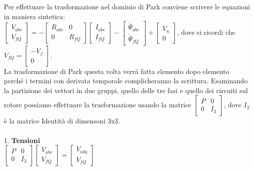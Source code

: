 \documentclass[Lau,noexaminfo]{sapthesis}
\begin{document}
	Per effettuare la trasformazione nel dominio di Park conviene scrivere le equazioni in maniera sintetica:\\
	$\begin{bmatrix}
		V_{abc}\\
		V_{fQ}
	\end{bmatrix}=-
	\begin{bmatrix}
		R_{abc} & 0\\
		0 & R_{fQ}
	\end{bmatrix}
	\begin{bmatrix}
	I_{abc}\\
	I_{fQ}
	\end{bmatrix}-
	\begin{bmatrix}
	\dot{\Psi}_{abc}\\
	\dot{\Psi}_{fQ}
	\end{bmatrix}+
	\begin{bmatrix}
	V_{n}\\
	0
	\end{bmatrix}$, dove si ricordi che\\
	$V_{fQ}=\begin{bmatrix}
	-V_{f}\\
	0
	\end{bmatrix}$.\\ La trasformazione di Park questa volta verrà fatta elemento dopo elemento perché i termini con derivata temporale complicheranno la scrittura. Esaminando la partizione dei vettori in due gruppi, quello delle tre fasi e quello dei circuiti sul rotore possiamo effettuare la trasformazione usando la matrice $\begin{bmatrix}
	P & 0\\
	0 & I_3
	\end{bmatrix}$, dove $I_3$ è la matrice Identità di dimensoni 3x3.\\\\
	1. \textbf{Tensioni}\\
	$\begin{bmatrix}
	P & 0\\
	0 & I_3
	\end{bmatrix}
	\begin{bmatrix}
		V_{abc}\\
		V_{fQ}
	\end{bmatrix}=
	\begin{bmatrix}
		V_{odq}\\
		V_{fQ}
	\end{bmatrix}$\\\\\\
\end{document}
